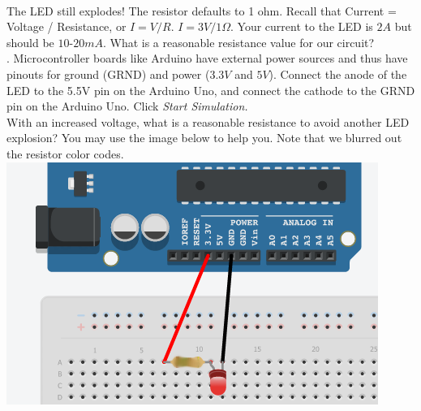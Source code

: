 \documentclass[12pt]{article}
\begin{document}
 \\

 The LED still explodes! The resistor defaults to 1 ohm. Recall that Current = Voltage / Resistance, or $I=V/R$. $I=3V/1\Omega$. Your current to the LED is $2A$ but should be $10$-$20mA$. What is a reasonable resistance value for our circuit? \\

. Microcontroller boards like Arduino have external power sources and thus have pinouts for ground (GRND) and power ($3.3V$ and $5V$). Connect the anode of the LED to the 5.5V pin on the Arduino Uno, and connect the cathode to the GRND pin on the Arduino Uno. Click \textit{Start Simulation.} \\

 With an increased voltage, what is a reasonable resistance to avoid another LED explosion? You may use the image below to help you. Note that we blurred out the resistor color codes. \\
 
\includegraphics{arduino_led} \\
 
\end{document}
